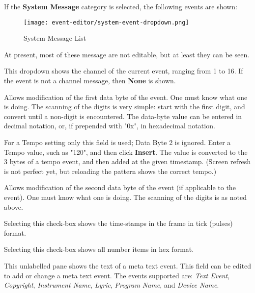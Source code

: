    If the \textbf{System Message} category is selected, the following events are
   shown:

\begin{figure}[H]
   \centering
   \texttt{[image: event-editor/system-event-dropdown.png]}
   \caption{System Message List}
   \label{fig:event_editor_system_dropdown}
\end{figure}

   At present, most of these message are not editable, but at least they can be
   seen.

   This dropdown shows the channel of the current event, ranging from 1 to 16.
   If the event is not a channel message, then \textbf{None} is shown.

   Allows modification of the first data byte of the event.
   One must know what one is doing.
   The scanning of the digits is very simple:  start with the first digit, and
   convert until a non-digit is encountered.  The data-byte value can be
   entered in decimal notation, or, if prepended with "0x", in hexadecimal
   notation.

   For a Tempo setting only this field is used; Data Byte 2 is ignored.
   Enter a Tempo value, such as "120", and then click \textbf{Insert}. The
   value is converted to the 3 bytes of a tempo event, and then
   added at the given timestamp.  (Screen refresh is not perfect yet, but
   reloading the pattern shows the correct tempo.)

   Allows modification of the second data byte of the event (if applicable
   to the event).
   One must know what one is doing.
   The scanning of the digits is as noted above.

   Selecting this check-box
   shows the time-stamps in the frame in tick (pulses) format.

   Selecting this check-box
   shows all number items in hex format.

   This unlabelled pane shows the text of a meta text event.
   This field can be edited to add or change a meta text event.
   The events supported are:
   \textsl{Text Event},
   \textsl{Copyright},
   \textsl{Instrument Name},
   \textsl{Lyric},
   \textsl{Program Name}, and
   \textsl{Device Name}.


